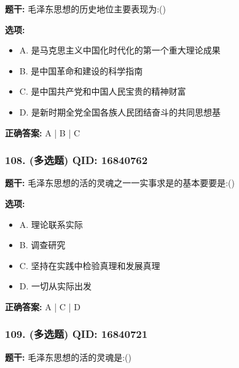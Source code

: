 \documentclass[12pt,UTF8]{ctexart}
\begin{document}
\textbf{题干:}
毛泽东思想的历史地位主要表现为:()

\textbf{选项:}
\begin{itemize}[leftmargin=*]

  \item A. 是马克思主义中国化时代化的第一个重大理论成果

  \item B. 是中国革命和建设的科学指南

  \item C. 是中国共产党和中国人民宝贵的精神财富

  \item D. 是新时期全党全国各族人民团结奋斗的共同思想基

\end{itemize}

\textbf{正确答案:}
A | B | C

\vspace{0.3em}\hrulefill\vspace{0.7em}

\subsubsection*{108. (多选题) \small QID: 16840762}

\textbf{题干:}
毛泽东思想的活的灵魂之一一实事求是的基本要要是:()

\textbf{选项:}
\begin{itemize}[leftmargin=*]

  \item A. 理论联系实际

  \item B. 调查研究

  \item C. 坚持在实践中检验真理和发展真理

  \item D. 一切从实际出发

\end{itemize}

\textbf{正确答案:}
A | C | D

\vspace{0.3em}\hrulefill\vspace{0.7em}

\subsubsection*{109. (多选题) \small QID: 16840721}

\textbf{题干:}
毛泽东思想的活的灵魂是:()
\end{document}
